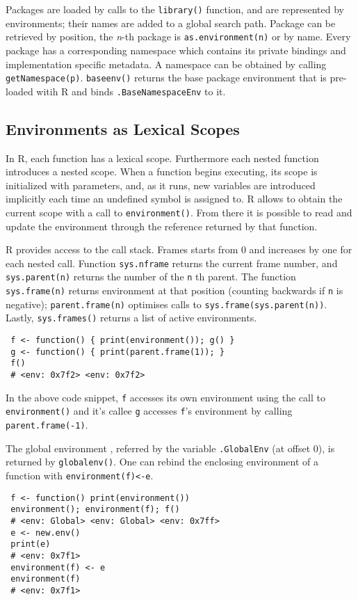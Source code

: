 \documentclass[10pt,review,sigplan,authorversion=true]{acmart}
\renewcommand{\c}[1]{\lstinline |#1|\xspace}
\begin{document}
Packages are loaded by calls to the \c{library()} function, and are
represented by environments; their names are added to a global search path.
Package can be retrieved by position, the \emph{n}-th package is
\c{as.environment(n)} or by name. Every package has a corresponding namespace
which contains its private bindings and implementation specific metadata. A
namespace can be obtained by calling \c{getNamespace(p)}. \c{baseenv()}
returns the base package environment that is pre-loaded witih R and binds
\c{.BaseNamespaceEnv} to it.


\subsection{Environments as Lexical Scopes}

In R, each function has a lexical scope. Furthermore each nested function
introduces a nested scope. When a function begins executing, its scope is
initialized with parameters, and, as it runs, new variables are introduced
implicitly each time an undefined symbol is assigned to. R allows to obtain the
current scope with a call to \c{environment()}. From there it is possible to
read and update the environment through the reference returned by that function.

R provides access to the call stack. Frames starts from 0 and increases by one
for each nested call. Function \c{sys.nframe} returns the current frame
number, and \c{sys.parent(n)} returns the number of the \c{n}th parent.
The function \c{sys.frame(n)} returns environment at that position (counting
backwards if \c{n} is negative); \c{parent.frame(n)} optimises calls to
\c{sys.frame(sys.parent(n))}. Lastly, \c{sys.frames()} returns a list of
active environments.

\begin{lstlisting}
 f <- function() { print(environment()); g() }
 g <- function() { print(parent.frame(1)); }
 f()
 # <env: 0x7f2> <env: 0x7f2>
\end{lstlisting}

\noindent
In the above code snippet, \c{f} accesses its own environment using the call to
\c{environment()} and it's callee \c{g} accesses \c{f}'s environment by calling
\c{parent.frame(-1)}.

The global environment , referred by the variable \c{.GlobalEnv} (at offset
0), is returned by \c{globalenv()}. One can rebind the enclosing environment
of a function with \c{environment(f)<-e}.

\begin{lstlisting}
 f <- function() print(environment())
 environment(); environment(f); f()
 # <env: Global> <env: Global> <env: 0x7ff>
 e <- new.env()
 print(e)
 # <env: 0x7f1>
 environment(f) <- e
 environment(f)
 # <env: 0x7f1>
\end{lstlisting}
\end{document}
